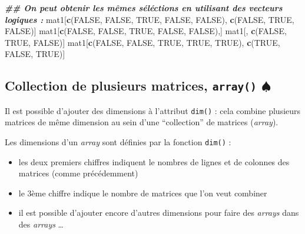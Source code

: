 \documentclass[
]{book}
\newenvironment{Shaded}{\begin{snugshade}}{\end{snugshade}}
\newcommand{\ConstantTok}[1]{\textcolor[rgb]{0.56,0.35,0.01}{#1}}
\newcommand{\DocumentationTok}[1]{\textcolor[rgb]{0.56,0.35,0.01}{\textbf{\textit{#1}}}}
\newcommand{\FunctionTok}[1]{\textcolor[rgb]{0.13,0.29,0.53}{\textbf{#1}}}
\newcommand{\NormalTok}[1]{#1}
\providecommand{\tightlist}{%
  \setlength{\itemsep}{0pt}\setlength{\parskip}{0pt}}
\begin{document}
\begin{Shaded}
\begin{Highlighting}[]
\DocumentationTok{\#\# On peut obtenir les mêmes séléctions en utilisant des vecteurs logiques : }
\NormalTok{mat1[}\FunctionTok{c}\NormalTok{(}\ConstantTok{FALSE}\NormalTok{, }\ConstantTok{FALSE}\NormalTok{, }\ConstantTok{TRUE}\NormalTok{, }\ConstantTok{FALSE}\NormalTok{, }\ConstantTok{FALSE}\NormalTok{), }\FunctionTok{c}\NormalTok{(}\ConstantTok{FALSE}\NormalTok{, }\ConstantTok{TRUE}\NormalTok{, }\ConstantTok{FALSE}\NormalTok{)]}
\NormalTok{mat1[}\FunctionTok{c}\NormalTok{(}\ConstantTok{FALSE}\NormalTok{, }\ConstantTok{FALSE}\NormalTok{, }\ConstantTok{TRUE}\NormalTok{, }\ConstantTok{FALSE}\NormalTok{, }\ConstantTok{FALSE}\NormalTok{),]}
\NormalTok{mat1[, }\FunctionTok{c}\NormalTok{(}\ConstantTok{FALSE}\NormalTok{, }\ConstantTok{TRUE}\NormalTok{, }\ConstantTok{FALSE}\NormalTok{)]}
\NormalTok{mat1[}\FunctionTok{c}\NormalTok{(}\ConstantTok{FALSE}\NormalTok{, }\ConstantTok{FALSE}\NormalTok{, }\ConstantTok{TRUE}\NormalTok{, }\ConstantTok{TRUE}\NormalTok{, }\ConstantTok{TRUE}\NormalTok{), }\FunctionTok{c}\NormalTok{(}\ConstantTok{TRUE}\NormalTok{, }\ConstantTok{FALSE}\NormalTok{, }\ConstantTok{TRUE}\NormalTok{)]}
\end{Highlighting}
\end{Shaded}

\subsection{\texorpdfstring{Collection de plusieurs matrices, \texttt{array()} \(\spadesuit\)}{Collection de plusieurs matrices, array() \textbackslash spadesuit}}\label{collection-de-plusieurs-matrices-array-spadesuit}

Il est possible d'ajouter des dimensions à l'attribut \texttt{dim()} : cela combine plusieurs matrices de même dimension au sein d'une ``collection'' de matrices (\emph{array}).

Les dimensions d'un \emph{array} sont définies par la fonction \texttt{dim()} :

\begin{itemize}
\tightlist
\item
  les deux premiers chiffres indiquent le nombres de lignes et de colonnes des matrices (comme précédemment)
\item
  le 3ème chiffre indique le nombre de matrices que l'on veut combiner
\item
  il est possible d'ajouter encore d'autres dimensions pour faire des \emph{arrays} dans des \emph{arrays} \ldots{}
\end{itemize}
\end{document}
